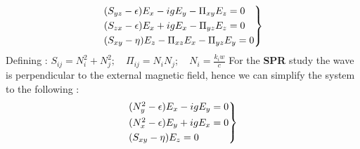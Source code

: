 \documentclass[11pt,a4paper]{report}
\begin{document}
\begin{multicols}{2}
    \begin{equation}
        \begin{rcases}
            (S_{yz} - \epsilon)E_x - igE_y - \Pi_{xy}E_z = 0 \\
            (S_{zx} - \epsilon)E_x + igE_x - \Pi_{yz}E_z = 0 \\
            (S_{xy} - \eta)E_z -\Pi_{xz}E_x - \Pi_{yz}E_y = 0
        \end{rcases}
    \end{equation}
    Defining : $S_{ij} = N_i^2 + N_j^2; \quad \Pi_{ij} = N_iN_j ; \quad N_{i} = \frac{k_iw}{c}$
    For the \textbf{SPR} study the wave is perpendicular to the external magnetic field, hence we can simplify the system to the following :
    \begin{equation}
        \begin{rcases}
            (N_y^2 - \epsilon)E_x - igE_y = 0 \\
            (N_x^2 - \epsilon)E_y + igE_x = 0 \\
            (S_{xy} - \eta)E_z = 0
        \end{rcases}
    \end{equation}


\end{multicols}
\end{document}
